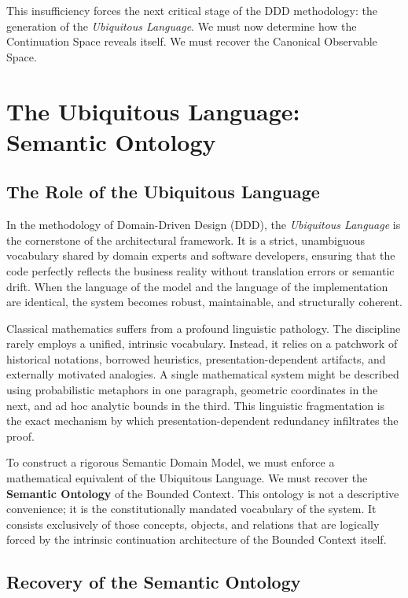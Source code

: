 \documentclass[12pt,openany]{extbook}
\theoremstyle{plain}
\theoremstyle{definition}
\begin{document}
This insufficiency forces the next critical stage of the DDD methodology: the generation of the \emph{Ubiquitous Language}. We must now determine how the Continuation Space reveals itself. We must recover the Canonical Observable Space.

\chapter{The Ubiquitous Language: Semantic Ontology}

\section{The Role of the Ubiquitous Language}

In the methodology of Domain-Driven Design (DDD), the \emph{Ubiquitous Language} is the cornerstone of the architectural framework. It is a strict, unambiguous vocabulary shared by domain experts and software developers, ensuring that the code perfectly reflects the business reality without translation errors or semantic drift. When the language of the model and the language of the implementation are identical, the system becomes robust, maintainable, and structurally coherent.

Classical mathematics suffers from a profound linguistic pathology. The discipline rarely employs a unified, intrinsic vocabulary. Instead, it relies on a patchwork of historical notations, borrowed heuristics, presentation-dependent artifacts, and externally motivated analogies. A single mathematical system might be described using probabilistic metaphors in one paragraph, geometric coordinates in the next, and ad hoc analytic bounds in the third. This linguistic fragmentation is the exact mechanism by which presentation-dependent redundancy infiltrates the proof.

To construct a rigorous Semantic Domain Model, we must enforce a mathematical equivalent of the Ubiquitous Language. We must recover the \textbf{Semantic Ontology} of the Bounded Context. This ontology is not a descriptive convenience; it is the constitutionally mandated vocabulary of the system. It consists exclusively of those concepts, objects, and relations that are logically forced by the intrinsic continuation architecture of the Bounded Context itself.

\section{Recovery of the Semantic Ontology}
\end{document}
